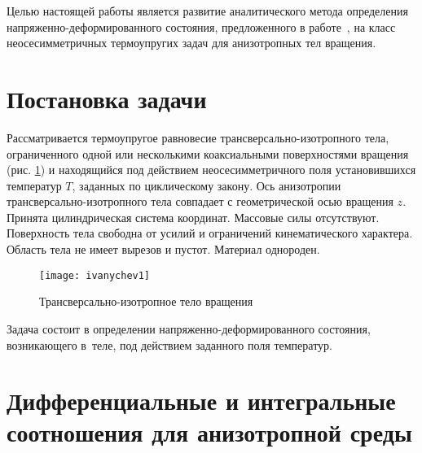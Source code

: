 \documentclass[press]{vestnik}
\begin{document}
Целью настоящей работы является развитие аналитического метода определения 
напряженно-деформированного состояния, предложенного в работе~\cite{B10}, на класс 
неосесимметричных термоупругих задач для анизотропных тел вращения.

\section{Постановка задачи}

Рассматривается термоупругое равновесие трансверсально-изотропного тела, 
ограниченного одной или несколькими коаксиальными поверхностями вращения 
(рис. \ref{fig1}) и находящийся под действием неосесимметричного поля установившихся 
температур $T$, заданных по циклическому закону. Ось анизотропии 
трансверсально-изотропного тела совпадает с геометрической осью вращения 
$z$. Принята цилиндрическая система координат. Массовые силы отсутствуют. 
Поверхность тела свободна от усилий и ограничений кинематического характера. 
Область тела не имеет вырезов и пустот. Материал однороден.

\begin{figure}[h]
\centering
\texttt{[image: ivanychev1]}
\caption{Трансверсально-изотропное тело вращения}
\label{fig1}
\end{figure}

Задача состоит в определении напряженно-деформированного состояния, 
возникающего в~теле, под действием заданного поля температур.

\section{Дифференциальные и интегральные соотношения для анизотропной среды}
\end{document}
